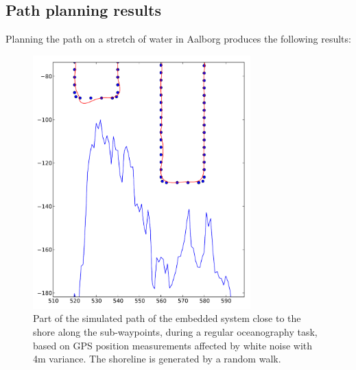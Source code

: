 \documentclass{ifacconf}
\begin{document}
\subsection{Path planning results}
Planning the path on a stretch of water in Aalborg produces the following results:
\begin{figure}
	\begin{center}
		\includegraphics[width=8.4cm]{img/Navi}    %
		\caption{Part of the simulated path of the embedded system close to the shore along the sub-waypoints, during a regular oceanography task, based on GPS position measurements affected by white noise with 4m variance. The shoreline is generated by a random walk.}  %
		\label{fig:navi}               
	\end{center}                                 %
\end{figure}
\end{document}
